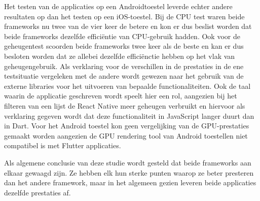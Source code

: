 Het testen van de applicaties op een Androidtoestel leverde echter andere resultaten op dan het testen op een iOS-toestel. Bij de CPU test waren beide frameworks nu twee van de vier keer de betere en kon er dus beslist worden dat beide frameworks dezelfde efficiëntie van CPU-gebruik hadden. Ook voor de geheugentest scoorden beide frameworks twee keer als de beste en kan er dus besloten worden dat ze allebei dezelfde efficiënctie hebben op het vlak van geheugengebruik. Als verklaring voor de verschillen in de prestaties in de ene testsituatie vergeleken met de andere wordt gewezen naar het gebruik van de externe libraries voor het uitvoeren van bepaalde functionaliteiten. Ook de taal waarin de applicatie geschreven wordt speelt hier een rol, aangezien bij het filteren van een lijst de React Native meer geheugen verbruikt en hiervoor als verklaring gegeven wordt dat deze functionaliteit in JavaScript langer duurt dan in Dart. Voor het Android toestel kon geen vergelijking van de GPU-prestaties gemaakt worden aangezien de GPU rendering tool van Android toestellen niet compatibel is met Flutter applicaties.

Als algemene conclusie van deze studie wordt gesteld dat beide frameworks aan elkaar gewaagd zijn. Ze hebben elk hun sterke punten waarop ze beter presteren dan het andere framework, maar in het algemeen gezien leveren beide applicaties dezelfde prestaties af. 


